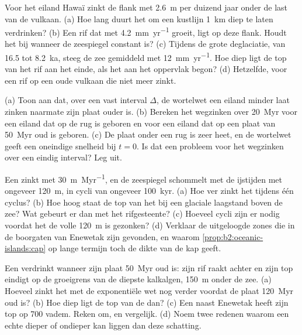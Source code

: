 \begin{exercise}[$\star\star$]\label{exo:b2:oceanic-islands:9}
Voor het eiland Hawaï zinkt de flank met \qty{2.6}{m} per duizend jaar onder de last van de
vulkaan. (a) Hoe lang duurt het om een kustlijn \qty{1}{km} diep te laten verdrinken? (b) Een rif dat met
\qty{4.2}{mm.yr^{-1}} groeit, ligt op deze flank. Houdt het bij wanneer de zeespiegel constant is? (c) Tijdens de
grote deglaciatie, van 16.5 tot \qty{8.2}{ka}, steeg de zee gemiddeld met \qty{12}{mm.yr^{-1}}. Hoe
diep ligt de top van het rif aan het einde, als het aan het oppervlak begon? (d) Hetzelfde, voor een rif op
een oude vulkaan die niet meer zinkt.
\end{exercise}

\begin{exercise}[$\star\star\star$]\label{exo:b2:oceanic-islands:10}
(a) Toon aan dat, over een vast interval $\Delta$, de wortelwet een eiland minder laat zinken naarmate zijn
plaat ouder is. (b) Bereken het wegzinken over \qty{20}{Myr} voor een eiland dat op de rug is geboren en voor een eiland dat
op een plaat van \qty{50}{Myr} oud is geboren. (c) De plaat onder een rug is zeer heet, en de wortelwet geeft een
oneindige snelheid bij $t = 0$. Is dat een probleem voor het wegzinken over een eindig interval? Leg uit.
\end{exercise}

\begin{exercise}[$\star\star\star$]\label{exo:b2:oceanic-islands:11}
Een  zinkt met \qty{30}{m.Myr^{-1}}, en de zeespiegel schommelt met de ijstijden met ongeveer \qty{120}{m},
in cycli van ongeveer \qty{100}{kyr}. (a) Hoe ver zinkt het  tijdens één cyclus? (b) Hoe hoog
staat de top van het  bij een glaciale laagstand boven de zee? Wat gebeurt er dan met het
rifgesteente? (c) Hoeveel cycli zijn er nodig voordat het  de volle \qty{120}{m} is gezonken?
(d) Verklaar de uitgeloogde zones die in de boorgaten van Enewetak zijn gevonden, en waarom
\cref{prop:b2:oceanic-islands:cap} op lange termijn toch de dikte van de kap geeft.
\end{exercise}

\begin{exercise}[$\star\star\star$]\label{exo:b2:oceanic-islands:12}
Een  verdrinkt wanneer zijn plaat \qty{50}{Myr} oud is: zijn rif raakt achter en zijn top eindigt op de
groeigrens van de diepste kalkalgen, \qty{150}{m} onder de zee. (a) Hoeveel zinkt het met de exponentiële
wet nog verder voordat de plaat \qty{120}{Myr} oud is? (b) Hoe diep ligt de top
van de  dan? (c) Een  naast Enewetak heeft zijn top op 700 vadem. Reken om, en vergelijk.
(d) Noem twee redenen waarom een echte  dieper of ondieper kan liggen dan deze schatting.
\end{exercise}

